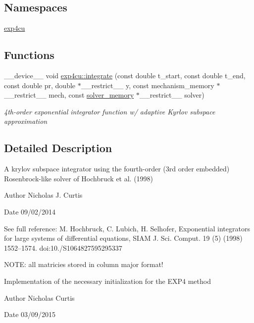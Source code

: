 \subsection*{Namespaces}
\begin{DoxyCompactItemize}
\item 
 \hyperlink{namespaceexp4cu}{exp4cu}
\end{DoxyCompactItemize}
\subsection*{Functions}
\begin{DoxyCompactItemize}
\item 
\+\_\+\+\_\+device\+\_\+\+\_\+ void \hyperlink{namespaceexp4cu_aac3abe15ef50061cdfe24ed7d9d64b7a}{exp4cu\+::integrate} (const double t\+\_\+start, const double t\+\_\+end, const double pr, double $\ast$\+\_\+\+\_\+restrict\+\_\+\+\_\+ y, const mechanism\+\_\+memory $\ast$\+\_\+\+\_\+restrict\+\_\+\+\_\+ mech, const \hyperlink{structsolver__memory}{solver\+\_\+memory} $\ast$\+\_\+\+\_\+restrict\+\_\+\+\_\+ solver)
\begin{DoxyCompactList}\small\item\em 4th-\/order exponential integrator function w/ adaptive Kyrlov subspace approximation \end{DoxyCompactList}\end{DoxyCompactItemize}


\subsection{Detailed Description}
A krylov subspace integrator using the fourth-\/order (3rd order embedded) Rosenbrock-\/like solver of Hochbruck et al. (1998) 

\begin{DoxyAuthor}{Author}
Nicholas J. Curtis 
\end{DoxyAuthor}
\begin{DoxyDate}{Date}
09/02/2014
\end{DoxyDate}
See full reference\+: M. Hochbruck, C. Lubich, H. Selhofer, Exponential integrators for large systems of differential equations, S\+I\+AM J. Sci. Comput. 19 (5) (1998) 1552–1574. doi\+:10./\+S1064827595295337

N\+O\+TE\+: all matricies stored in column major format!

Implementation of the necessary initialization for the E\+X\+P4 method

\begin{DoxyAuthor}{Author}
Nicholas Curtis 
\end{DoxyAuthor}
\begin{DoxyDate}{Date}
03/09/2015 
\end{DoxyDate}
